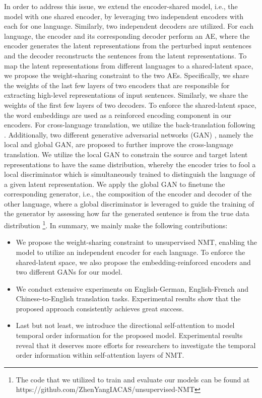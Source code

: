 \documentclass[11pt,a4paper]{article}
\begin{document}
In order to address this issue, we extend the encoder-shared model, i.e., the model with one shared encoder, by leveraging two independent encoders with each for one language. Similarly, two independent decoders are utilized. For each language, the encoder and its corresponding decoder perform an AE, where the encoder generates the latent representations from the perturbed input sentences and the decoder reconstructs the sentences from the latent representations. To map the latent representations from different languages to a shared-latent space, we propose the weight-sharing constraint to the two AEs. Specifically, we share the weights of the last few layers of two encoders that are responsible for extracting high-level representations of input sentences. Similarly, we share the weights of the first few layers of two decoders. To enforce the shared-latent space, the word embeddings are used as a reinforced encoding component in our encoders. For cross-language translation, we utilize the back-translation following \cite{Lample2017Unsupervised}. Additionally, two different generative adversarial networks (GAN) \cite{Yang2017Improving}, namely the local and global GAN, are proposed to further improve the cross-language translation. We utilize the local GAN to constrain the source and target latent representations to have the same distribution, whereby the encoder tries to fool a local discriminator which is simultaneously trained to distinguish the language of a given latent representation. We apply the global GAN to finetune the corresponding generator, i.e., the composition of the encoder and decoder of the other language, where a global discriminator is leveraged to guide the training of the generator by assessing how far the generated sentence is from the true data distribution \footnote{The code that we utilized to train and evaluate our models can be found at https://github.com/ZhenYangIACAS/unsupervised-NMT}.  In summary, we mainly make the following contributions:

\begin{itemize}
\item We propose the weight-sharing constraint to unsupervised NMT, enabling the model to utilize an independent encoder for each language. To enforce the shared-latent space, we also propose the embedding-reinforced encoders and two different GANs for our model.
\item We conduct extensive experiments on English-German, English-French and Chinese-to-English translation tasks. Experimental results show that the proposed approach consistently achieves great success.
\item Last but not least, we introduce the directional self-attention to model temporal order information for the proposed model. Experimental results reveal that it deserves more efforts for researchers to investigate the temporal order information within self-attention layers of NMT.
\end{itemize}
\end{document}
